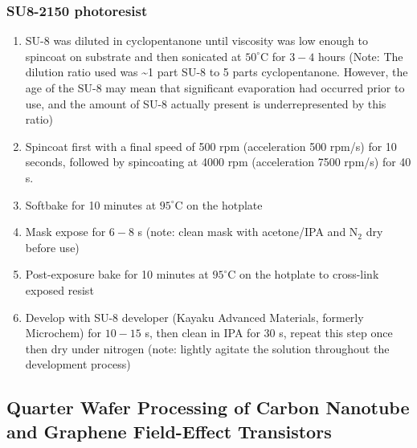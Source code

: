 \documentclass[
  letterpaper,
  DIV=11,
  numbers=noendperiod]{scrartcl}
\begin{document}
\hypertarget{su8-2150-photoresist}{%
\subsubsection{SU8-2150 photoresist}\label{su8-2150-photoresist}}

\begin{enumerate}
\def\labelenumi{\arabic{enumi}.}
\item
  SU-8 was diluted in cyclopentanone until viscosity was low enough to
  spincoat on substrate and then sonicated at \(50^\circ\)C for \(3-4\)
  hours (Note: The dilution ratio used was \textasciitilde1 part SU-8 to
  5 parts cyclopentanone. However, the age of the SU-8 may mean that
  significant evaporation had occurred prior to use, and the amount of
  SU-8 actually present is underrepresented by this ratio)
\item
  Spincoat first with a final speed of 500 rpm (acceleration 500 rpm/s)
  for 10 seconds, followed by spincoating at 4000 rpm (acceleration 7500
  rpm/s) for 40 s.
\item
  Softbake for 10 minutes at \(95^\circ\)C on the hotplate
\item
  Mask expose for \(6-8\) s (note: clean mask with acetone/IPA and
  N\(_2\) dry before use)
\item
  Post-exposure bake for 10 minutes at \(95^\circ\)C on the hotplate to
  cross-link exposed resist
\item
  Develop with SU-8 developer (Kayaku Advanced Materials, formerly
  Microchem) for \(10-15\) s, then clean in IPA for 30 s, repeat this
  step once then dry under nitrogen (note: lightly agitate the solution
  throughout the development process)
\end{enumerate}

\hypertarget{sec-qw-processing}{%
\subsection{Quarter Wafer Processing of Carbon Nanotube and Graphene
Field-Effect Transistors}\label{sec-qw-processing}}
\end{document}
